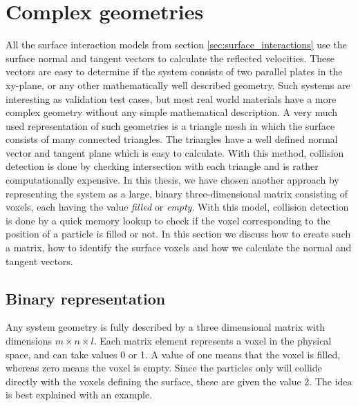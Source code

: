 \section{Complex geometries}
\label{sec:dsmc_complex_geometries}
All the surface interaction models from section \ref{sec:surface_interactions} use the surface normal and tangent vectors to calculate the reflected velocities. These vectors are easy to determine if the system consists of two parallel plates in the xy-plane, or any other mathematically well described geometry. Such systems are interesting as validation test cases, but most real world materials have a more complex geometry without any simple mathematical description. A very much used representation of such geometries is a triangle mesh in which the surface consists of many connected triangles. The triangles have a well defined normal vector and tangent plane which is easy to calculate. With this method, collision detection is done by checking intersection with each triangle and is rather computationally expensive. In this thesis, we have chosen another approach by representing the system as a large, binary three-dimensional matrix consisting of voxels, each having the value \textit{filled} or \textit{empty}. With this model, collision detection is done by a quick memory lookup to check if the voxel corresponding to the position of a particle is filled or not. In this section we discuss how to create such a matrix, how to identify the surface voxels and how we calculate the normal and tangent vectors. 

\subsection{Binary representation}
\label{sec:dsmc_binary_representation}
Any system geometry is fully described by a three dimensional matrix with dimensions $m\times n\times l$. Each matrix element represents a voxel in the physical space, and can take values 0 or 1. A value of one means that the voxel is filled, whereas zero means the voxel is empty. Since the particles only will collide directly with the voxels defining the surface, these are given the value 2. The idea is best explained with an example.
